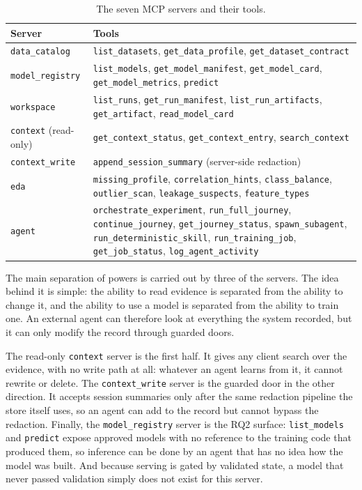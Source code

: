 \begin{table}[H]
\centering
\caption{The seven MCP servers and their tools.}
\label{tab:mcpservers}
\small
\begin{tabular}{p{3.2cm}p{10.3cm}}
\toprule
\textbf{Server} & \textbf{Tools} \\
\midrule
\texttt{data\_catalog} & \texttt{list\_datasets}, \texttt{get\_data\_profile}, \texttt{get\_dataset\_contract} \\
\texttt{model\_registry} & \texttt{list\_models}, \texttt{get\_model\_manifest}, \texttt{get\_model\_card}, \texttt{get\_model\_metrics}, \texttt{predict} \\
\texttt{workspace} & \texttt{list\_runs}, \texttt{get\_run\_manifest}, \texttt{list\_run\_artifacts}, \texttt{get\_artifact}, \texttt{read\_model\_card} \\
\texttt{context} (read-only) & \texttt{get\_context\_status}, \texttt{get\_context\_entry}, \texttt{search\_context} \\
\texttt{context\_write} & \texttt{append\_session\_summary} (server-side redaction) \\
\texttt{eda} & \texttt{missing\_profile}, \texttt{correlation\_hints}, \texttt{class\_balance}, \texttt{outlier\_scan}, \texttt{leakage\_suspects}, \texttt{feature\_types} \\
\texttt{agent} & \texttt{orchestrate\_experiment}, \texttt{run\_full\_journey}, \texttt{continue\_journey}, \texttt{get\_journey\_status}, \texttt{spawn\_subagent}, \texttt{run\_deterministic\_skill}, \texttt{run\_training\_job}, \texttt{get\_job\_status}, \texttt{log\_agent\_activity} \\
\bottomrule
\end{tabular}
\end{table}

The main separation of powers is carried out by three of the servers. The idea behind it is simple: the ability to read evidence is separated from the
ability to change it, and the ability to use a model is separated from the ability to train one. An external agent can therefore look at everything the system recorded, but it can only modify the record through guarded doors.

The read-only \texttt{context} server is the first half. It gives any client search over the evidence, with no write path at all: whatever an agent learns from it, it cannot rewrite or delete. The \texttt{context\_write} server is the guarded door in the other direction. It accepts session summaries only after the same redaction pipeline the store itself uses, so an agent can add to the record but cannot bypass the redaction. Finally, the \texttt{model\_registry} server is the RQ2 surface: \texttt{list\_models} and \texttt{predict} expose approved models with no reference to the training code that produced them, so inference can be done by an agent that has no idea how the model was built. And because serving is gated by validated state, a model that never passed validation simply does not exist for this server.

